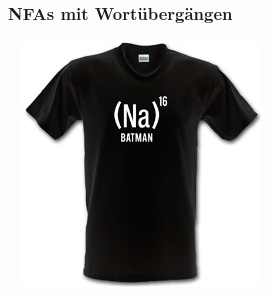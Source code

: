 \documentclass[onlymath]{beamer}
\begin{document}
\begin{frame}\frametitle{NFAs mit Wortübergängen}

~\hfill
\includegraphics[height=6.5cm]{a3}
\hfill~

\end{frame}
\end{document}
